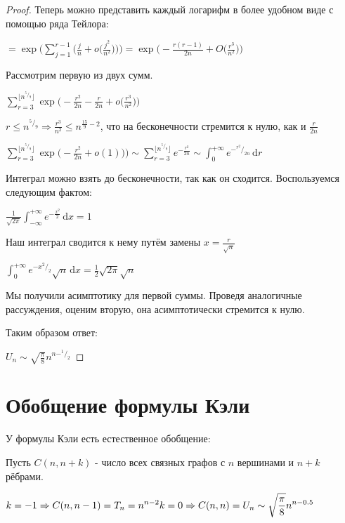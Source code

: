 \begin{proof}
Теперь можно представить каждый логарифм в более удобном виде с помощью ряда Тейлора:

$ =  \exp \bigg (\sum \limits _{j=1} ^{r-1} \bigg ( \frac j n + o \bigg(\frac {j^2} {n^2} \bigg) \bigg) \bigg ) 
= \exp \bigg ( - \frac {r (r-1)} {2n} + O\bigg ( \frac {r^3} {n^2} \bigg )\bigg )$

Рассмотрим первую из двух сумм.

$\sum \limits _{r=3} ^{\lfloor n^{^5/_9}\rfloor } \exp \bigg ( - \frac {r^2} {2n} - \frac r {2n} + o\bigg ( \frac {r^3} {n^2} \bigg )\bigg ) $

$r \leq n^{^5/_9} \Rightarrow \frac {r^3} {n^2}  \leq n ^ {\frac {15} {9} - 2}$, что на бесконечности стремится к нулю, как и $ \frac r {2n} $

$\sum \limits _{r=3} ^{\lfloor n^{^5/_9}\rfloor } \exp \bigg ( - \frac {r^2} {2n}  + o(1)\bigg )\bigg ) \sim
\sum \limits _{r=3} ^{\lfloor n^{^5/_9}\rfloor } e^ {- \frac {r^2} {2n} } \sim \int_0^{+\infty} e^{-^{r^2} / _{2n}}\,\mathrm{d}r   $


Интеграл можно взять до бесконечности, так как он сходится. 
Воспользуемся следующим фактом:

$\frac 1 {\sqrt{2 \pi}} \int _{-\infty} ^{+\infty} e^{-\frac {x^2} 2} \, \mathrm{d}x = 1$

Наш интеграл сводится к нему путём замены $x = \frac r {\sqrt{n}}$

$  \int_0^{+\infty} e^{-{x^2} / _2}\sqrt{n}\,\mathrm{d}x = \frac 1 2 \sqrt{2\pi} \sqrt{n} $

Мы получили асимптотику для первой суммы. Проведя  аналогичные рассуждения, оценим вторую, она асимптотически стремится к нулю.

Таким образом ответ:

 $ U_n \sim \sqrt {\frac \pi 8 } n^{n-^1/_2}$
\end{proof} 

 

\section{Обобщение формулы Кэли}

 У формулы Кэли есть естественное обобщение:

Пусть $C(n,n+k)$ - число всех связных графов с $n$ вершинами и $n+k$ рёбрами.

$\displaystyle 
k = -1 \Rightarrow   C(n,n-1) = T_n = n^{n-2} \\
k = 0  \Rightarrow   C(n,n) = U_n \sim \sqrt{\frac \pi 8} n^{n-0.5} 
$

